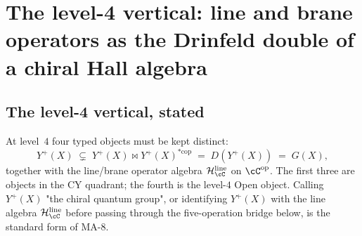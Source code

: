 \chapter{The level-4 vertical: line and brane operators as the
Drinfeld double of a chiral Hall algebra}
\label{ch:vertical-equivalence-level-4}

\providecommand{\Hbar}{\mathcal{H}}
\providecommand{\Yplus}{Y^{+}}
\providecommand{\GX}{G(X)}
\providecommand{\Stab}{\operatorname{Stab}}
\providecommand{\Hall}{\operatorname{Hall}}
\providecommand{\rmax}{r_{\max}}
\providecommand{\sptt}{\mathfrak{sp}}
\providecommand{\grtell}{\mathfrak{grt}^{\mathrm{ell}}}
\providecommand{\obs}{\operatorname{obs}}

\begin{abstract}
The fourth slot of the Open Beilinson tower is occupied by the
algebra of line and brane operators on the factorisation dg-category
$\cC^{\mathrm{op}}$ over a tangential log curve $(X, D, \tau)$. The
CY comparison object is the represented chiral quantum group
$\GX$, obtained from the Hall input~$\Yplus(X)$ by the Drinfeld-double
construction and the comparison maps below.  We state the level-$4$
vertical comparison on
$(X, D, \tau)$ as the composite of five named operations on the
positive half: the Hall pairing on
$\Yplus(X)\otimes \Yplus(X)^{*\mathrm{cop}}$; weight completion in
the Hall topology; passage to an integral form preserving the
Cartan; transport along the Maulik--Okounkov stable-envelope
cobordism; descent from the formal locus on $X^\circ$ to the global
factorisation site of $(X, D, \tau)$. The composite is a
strict $E_2$-comparison specified by the modular-Koszul, integral,
completed, stable-envelope-transported, and descended data. Each step
carries a named hypothesis package. At genus one, the represented KZB class is
transported to
$H^2(\Def_{\mathrm{double}}^\bullet(\cA))$ by the package
$H_{\mathrm{F5}}^{\mathrm{desc}}(\cA)$.  Its relation to shadow depth
is formulated as Conjecture~\ref{conj:level-4-F5-shadow-depth}.
\end{abstract}

\section{The level-4 vertical, stated}
\label{sec:level-4-vertical-statement}

\begin{convention}
\label{conv:level-4-five-object}
At level~$4$ four typed objects must be kept distinct:
\[
\Yplus(X) \;\subsetneq\; \Yplus(X)\bowtie \Yplus(X)^{*\mathrm{cop}}
\;=\; D(\Yplus(X)) \;=\; \GX,
\]
together with the line/brane operator algebra
$\Hbar^{\mathrm{line}}_\cC$ on $\cC^{\mathrm{op}}$. The first three
are objects in the CY quadrant; the fourth is the level-$4$ Open
object. Calling $\Yplus(X)$ "the chiral quantum group", or
identifying $\Yplus(X)$ with the line algebra
$\Hbar^{\mathrm{line}}_\cC$ before passing through the five-operation
bridge below, is the standard form of MA-$8$.
\end{convention}


